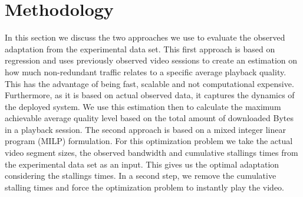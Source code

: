
\section{Methodology}

\label{sec:sysmodel}

In this section we discuss the two approaches we use to evaluate the observed adaptation from the experimental data set.
This first approach is based on regression and uses previously observed video sessions to create an estimation on how much non-redundant traffic relates to a specific average playback quality.
This has the advantage of being fast, scalable and not computational expensive. 
Furthermore, as it is based on actual observed data, it captures the dynamics of the deployed system.
We use this estimation then to calculate the maximum achievable average quality level based on the total amount of downloaded Bytes in a playback session.
The second approach is based on a mixed integer linear program (MILP) formulation. 
For this optimization problem we take the actual video segment sizes, the observed bandwidth and cumulative stallings times from the experimental data set as an input.
This gives us the optimal adaptation considering the stallings times.
In a second step, we remove the cumulative stalling times and force the optimization problem to instantly play the video.





